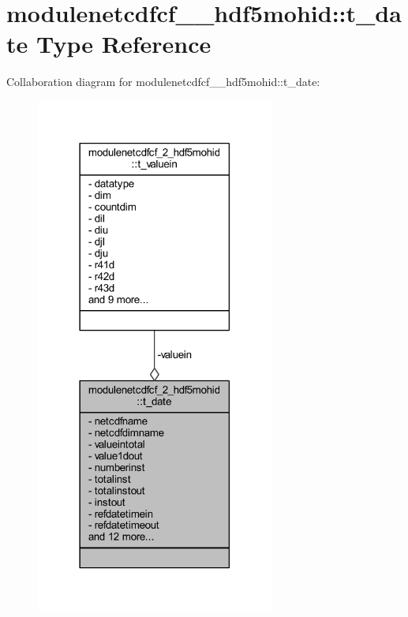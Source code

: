 \hypertarget{structmodulenetcdfcf__2__hdf5mohid_1_1t__date}{}\section{modulenetcdfcf\+\_\+\_\+hdf5mohid\+:\+:t\+\_\+date Type Reference}
\label{structmodulenetcdfcf__2__hdf5mohid_1_1t__date}


Collaboration diagram for modulenetcdfcf\+\_\+\_\+hdf5mohid\+:\+:t\+\_\+date\+:\nopagebreak
\begin{figure}[H]
\begin{center}
\leavevmode
\includegraphics[width=222pt]{structmodulenetcdfcf__2__hdf5mohid_1_1t__date__coll__graph}
\end{center}
\end{figure}
